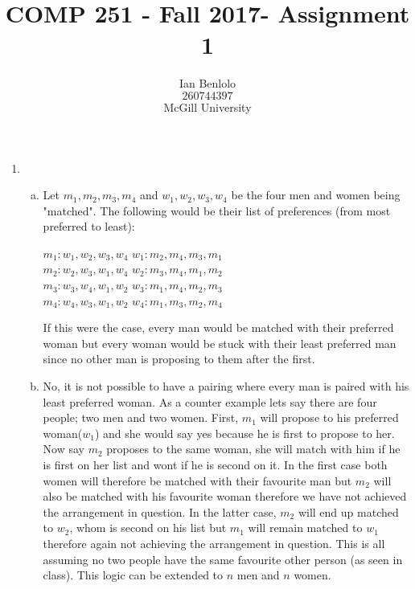 
\usepackage{cancel}
\usepackage{appendix}
\usepackage{color,soul}
\usepackage{amsmath}
\newenvironment{tightcenter}{%
  \setlength\topsep{0pt}
  \setlength\parskip{0pt}
  \begin{center}
}{%
  \end{center}
}
\usepackage{enumerate}
\title{COMP 251 - Fall 2017- Assignment 1}
\author{Ian Benlolo\\$260744397$\\McGill University \\}

\maketitle

\begin{enumerate}[1.]
\item \begin{enumerate}[(a)]
	\item Let $m_1, m_2, m_3, m_4$ and $w_1, w_2, w_3, w_4$ be the four men and women being "matched".
	The following would be their list of preferences (from most preferred to least):\\
	\begin{tightcenter}
	$m_1: w_1, w_2, w_3, w_4$ \hspace{1.75in} $w_1: m_2, m_4,m_3,m_1$ \\
	$m_2: w_2, w_3, w_1, w_4$ \hspace{1.75in} $w_2: m_3, m_4,m_1,m_2 $\\
	$m_3: w_3, w_4, w_1, w_2$  \hspace{1.75in} $w_3: m_1, m_4,m_2,m_3$\\
	$m_4: w_4, w_3, w_1, w_2$ \hspace{1.75in} $w_4: m_1, m_3,m_2,m_4$\\ 
	\end{tightcenter}
	If this were the case, every man would be matched with their preferred woman but every woman would be stuck with their least preferred man since no other man is proposing to them after the first. 
	\item No, it is not possible to have a pairing where every man is paired with his least preferred woman. As a counter example lets say there are four people; two men and two women. First, $m_1$ will propose to his preferred woman($w_1$) and she would say yes because he is first to propose to her. Now say $m_2$ proposes to the same woman, she will match with him if he is first on her list and wont if he is second on it. In the first case both women will therefore be matched with their favourite man but $m_2$ will also be matched with his favourite woman therefore we have not achieved the arrangement in question. In the latter case, $m_2$ will end up matched to $w_2$, whom is second on his list but $m_1$ will remain matched to $w_1$ therefore again not achieving the arrangement in question. This is all assuming no two people have the same favourite other person (as seen in class). This logic can be extended to $n$ men and $n$ women. 

\end{enumerate}
\end{enumerate}
